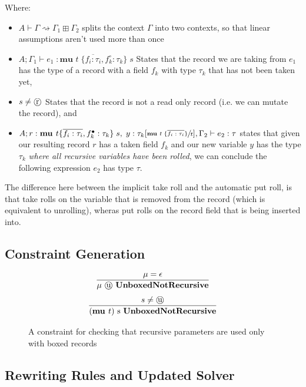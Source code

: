 Where:
\begin{itemize}
    \item $A \vdash \Gamma \rightsquigarrow \Gamma_1 \boxplus \Gamma_2$ splits the context $\Gamma$ into two contexts, so that linear assumptions aren't used 
          more than once
    \item $A;\Gamma_1 \vdash e_1\; : \textbf{mu } t\; \{ \overline{f_i : \tau_i}, f_k^\circ : \tau_k \}\; s$ States that the record we are taking from $e_1$
          has the type of a record with a field $f_k$ with type $\tau_k$ that has not been taken yet,
    \item $s \neq \text{\textcircled{r}}   \vspace{0.5em}$ States that the record is not a read only record (i.e. we can mutate the record), and
    \item $A; r : \textbf{mu } t \{ \overline{f_i : \tau_i}, f_k^\bullet : \tau_k \}\; s
            ,\; y : \tau_k[\sfrac{ \textbf{mu } t\; \{\overline{f_i : \tau_i} \}}{t}], \Gamma_2 \vdash e_2 : \tau$
          states that given our resulting record $r$ has a taken field $f_k$ and our new variable $y$ has the type $\tau_k$ \textit{where all recursive variables have been rolled},
          we can conclude the following expression $e_2$ has type $\tau$.
\end{itemize}

The difference here between the implicit \textsf{take} roll and the automatic \textsf{put} roll, is that \textsf{take} rolls on the variable that is removed from the record
(which is equivalent to unrolling), wheras \textsf{put} rolls on the record field that is being inserted into.


\subsection{Constraint Generation}

\begin{figure}
    \centering
    $$
        \infer{
            \mu \text{ \textcircled{u} } \textbf{UnboxedNotRecursive}
        }{
            \mu = \epsilon
        }
    $$
    $$
        \infer{
            (\textbf{mu } t) \text{ s } \textbf{UnboxedNotRecursive}
        }{
            s \neq \text{\textcircled{u}}
        }
    $$
    \caption{A constraint for checking that recursive parameters are used only with boxed records}
\end{figure}
\subsection{Rewriting Rules and Updated Solver}

